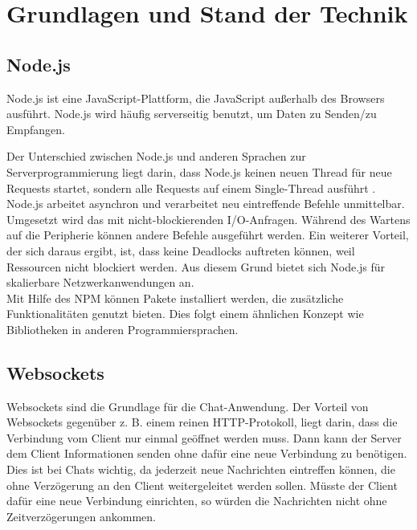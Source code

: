 
\chapter{Grundlagen und Stand der Technik}\label{cha:Grundlagen}
\section{Node.js}\label{sec:Node.JS}
Node.js ist eine JavaScript-Plattform, die JavaScript außerhalb des Browsers ausführt. Node.js wird häufig serverseitig benutzt, um Daten zu Senden/zu Empfangen. \cite[vgl.][]{Node.2019}

Der Unterschied zwischen Node.js und anderen Sprachen zur Serverprogrammierung liegt darin, dass Node.js keinen neuen Thread für neue Requests startet, sondern alle Requests auf einem Single-Thread ausführt \cite[vgl.][3]{Holmes.2013}. Node.js arbeitet asynchron und verarbeitet neu eintreffende Befehle unmittelbar. Umgesetzt wird das mit nicht-blockierenden I/O-Anfragen. Während des Wartens auf die Peripherie können andere Befehle ausgeführt werden. Ein weiterer Vorteil, der sich daraus ergibt, ist, dass keine Deadlocks auftreten können, weil Ressourcen nicht blockiert werden. Aus diesem Grund bietet sich Node.js für skalierbare Netzwerkanwendungen an. \cite[vgl.][4]{Holmes.2013}\\
Mit Hilfe des \acf{NPM} können Pakete installiert werden, die zusätzliche Funktionalitäten genutzt bieten. Dies folgt einem ähnlichen Konzept wie Bibliotheken in anderen Programmiersprachen.

\section{Websockets}\label{sec:Websockets}
Websockets sind die Grundlage für die Chat-Anwendung. Der Vorteil von Websockets gegenüber z. B. einem reinen \ac{HTTP}-Protokoll, liegt darin, dass die Verbindung vom Client nur einmal geöffnet werden muss. Dann kann der Server dem Client Informationen senden ohne dafür eine neue Verbindung zu benötigen. Dies ist bei Chats wichtig, da jederzeit neue Nachrichten eintreffen können, die ohne Verzögerung an den Client weitergeleitet werden sollen. Müsste der Client dafür eine neue Verbindung einrichten, so würden die Nachrichten nicht ohne Zeitverzögerungen ankommen.
